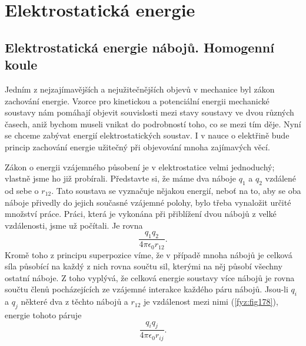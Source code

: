 \setchaptertoc
\chapter{Elektrostatická energie}\label{fyz:IIchapVI}
  \section{Elektrostatická energie nábojů. Homogenní koule}\label{fyz:IIchapVIsecI}
    Jedním z nejzajímavějších a nejužitečnějších objevů v mechanice byl zákon zachování energie.
    Vzorce pro kinetickou a potenciální energii mechanické soustavy nám pomáhají objevit souvislosti
    mezi stavy soustavy ve dvou různých časech, aniž bychom museli vnikat do podrobností toho, co se
    mezi tím děje. Nyní se chceme zabývat energií elektrostatických soustav. I v nauce o elektřině
    bude princip zachování energie užitečný při objevování mnoha zajímavých věcí.

    Zákon o energii vzájemného působení je v elektrostatice velmi jednoduchý; vlastně jsme ho již
    probírali. Představte si, že máme dva náboje \(q_1\) a \(q_2\) vzdálené od sebe o \(r_{12}\).
    Tato soustava se vyznačuje nějakou energií, neboť na to, aby se oba náboje přivedly do jejich
    současné vzájemné polohy, bylo třeba vynaložit určité množství práce. Práci, která je vykonána
    při přiblížení dvou nábojů z velké vzdálenosti, jsme už počítali. Je rovna
    \begin{equation}\label{fyz:eq868}
      \dfrac{q_1q_2}{4πϵ_0r_{12}}.      
    \end{equation}
    Kromě toho z principu superpozice víme, že v případě mnoha nábojů je celková síla působící na
    každý z nich rovna součtu sil, kterými na něj působí všechny ostatní náboje. Z toho vyplývá, že
    celková energie soustavy více nábojů je rovna součtu členů pocházejících ze vzájemné interakce
    každého páru nábojů. Jsou-li \(q_i\) a \(q_j\) některé dva z těchto nábojů a \(r_{12}\) je
    vzdálenost mezi nimi (\ref{fyz:fig178}), energie tohoto páruje
    \begin{equation}\label{fyz:eq869}
      \dfrac{q_iq_j}{4πϵ_0r_{ij}}.      
    \end{equation}

